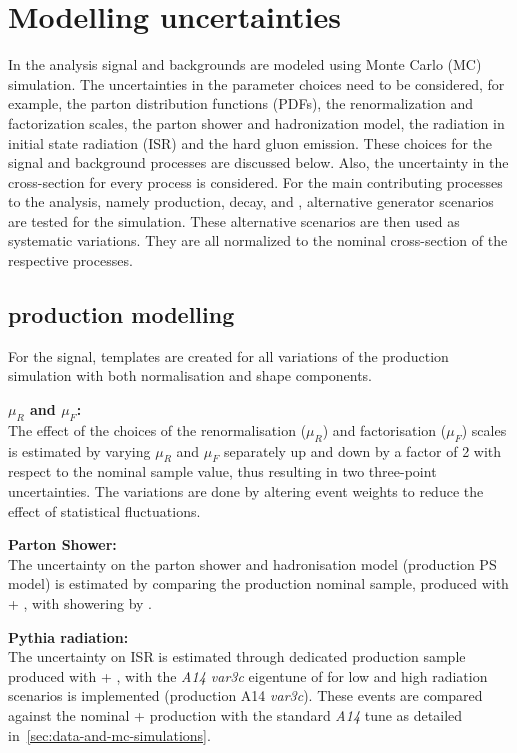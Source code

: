 \section{Modelling uncertainties}
\label{sec:theoretical_uncertainties}
In the analysis signal and backgrounds are modeled using Monte Carlo (MC) simulation. The uncertainties in the parameter choices need to be considered, for example, the parton distribution functions (PDFs), the renormalization and factorization scales, the parton shower and hadronization model, the radiation in initial state radiation (ISR) and the hard gluon emission. These choices for the signal and background processes are discussed below. Also, the uncertainty in the cross-section for every process is considered. For the main contributing processes to the analysis, namely \tty production, \tty decay, \ttbar and \tWy, alternative generator scenarios are tested for the simulation. These alternative scenarios are then used as systematic variations. They are all normalized to the nominal cross-section of the respective processes. 

\subsection{\tty production modelling}
For the signal, templates are created for all variations of the \tty production simulation with both normalisation and shape components. 

\textbf{$\mu_R$ and $\mu_F$:}\\
The effect of the choices of the renormalisation ($\mu_R$) and factorisation ($\mu_F$) scales is estimated by varying $\mu_R$ and $\mu_F$ separately up and down by a factor of 2 with respect to the nominal sample value, thus resulting in two three-point uncertainties. The variations are done by altering event weights to reduce the effect of statistical fluctuations. %

\textbf{Parton Shower:}\\
The uncertainty on the parton shower and hadronisation model (\tty production PS model) is estimated by comparing the \tty production nominal sample, produced with \amcshort + \pythia{}, with showering by \herwig{}. 

\textbf{Pythia radiation:}\\
The uncertainty on ISR is estimated through dedicated \tty production sample produced with \amcshort + \pythia{}, with the \emph{A14 var3c} eigentune of \pythia for low and high radiation scenarios is implemented (\tty production A14 \emph{var3c}). These events are compared against the nominal \amcshort + \pythia{} production with the standard \emph{A14} tune as detailed in~\cref{sec:data-and-mc-simulations}.


